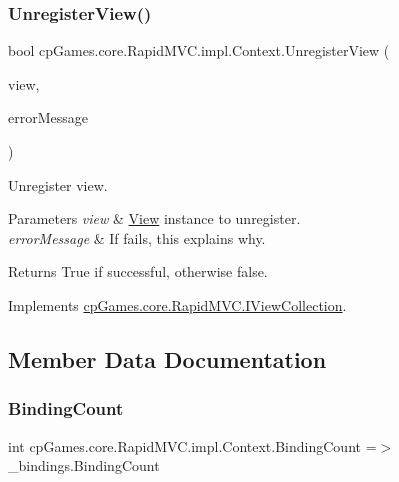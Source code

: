 \subsubsection{\texorpdfstring{UnregisterView()}{UnregisterView()}}
{\footnotesize\ttfamily bool cp\+Games.\+core.\+Rapid\+M\+V\+C.\+impl.\+Context.\+Unregister\+View (\begin{DoxyParamCaption}\item[{\mbox{\hyperlink{interfacecp_games_1_1core_1_1_rapid_m_v_c_1_1_i_view}{I\+View}}}]{view,  }\item[{out string}]{error\+Message }\end{DoxyParamCaption})}



Unregister view. 


\begin{DoxyParams}{Parameters}
{\em view} & \mbox{\hyperlink{classcp_games_1_1core_1_1_rapid_m_v_c_1_1_view}{View}} instance to unregister.\\
\hline
{\em error\+Message} & If fails, this explains why.\\
\hline
\end{DoxyParams}
\begin{DoxyReturn}{Returns}
True if successful, otherwise false.
\end{DoxyReturn}


Implements \mbox{\hyperlink{interfacecp_games_1_1core_1_1_rapid_m_v_c_1_1_i_view_collection_acc10b801eec02af0165b9e558a915682}{cp\+Games.\+core.\+Rapid\+M\+V\+C.\+I\+View\+Collection}}.



\subsection{Member Data Documentation}
\mbox{\label{classcp_games_1_1core_1_1_rapid_m_v_c_1_1impl_1_1_context_aeb686caac63068142940fb6a5ad2220c}} 
\subsubsection{\texorpdfstring{BindingCount}{BindingCount}}
{\footnotesize\ttfamily int cp\+Games.\+core.\+Rapid\+M\+V\+C.\+impl.\+Context.\+Binding\+Count =$>$ \+\_\+bindings.\+Binding\+Count}

